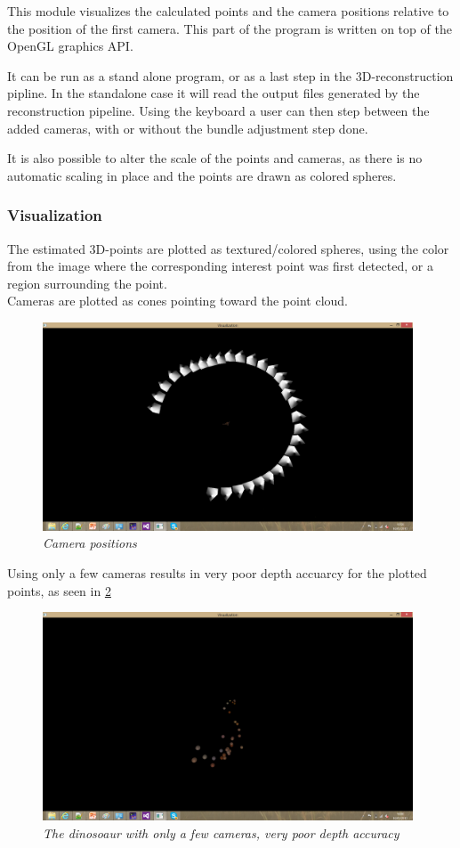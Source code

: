 This module visualizes the calculated points and the camera positions relative to the position of the first camera. This part of the program is written on top of the OpenGL graphics API.

It can be run as a stand alone program, or as a last step in the 3D-reconstruction pipline. In the standalone case it will read the output files generated by the reconstruction pipeline. Using the keyboard a user can then step between the added cameras, with or without the bundle adjustment step done.

It is also possible to alter the scale of the points and cameras, as there is no automatic scaling in place and the points are drawn as colored spheres.

\subsubsection{Visualization}
The estimated 3D-points are plotted as textured/colored spheres, using the color from the image where the corresponding interest point was first detected, or a region surrounding the point. \\
Cameras are plotted as cones pointing toward the point cloud.

\begin{figure}[htb]
	\centering
	\includegraphics[width=110mm]{images/camRingLots.png}
	\caption{\textit{Camera positions}}
	\label{fig:camRingLots}  %
\end{figure}

Using only a few cameras results in very poor depth accuarcy for the plotted points, as seen in 
\ref{fig:camRingFew}

\begin{figure}[htb]
	\centering
	\includegraphics[width=110mm]{images/pointCloudFewCam.png}
	\caption{\textit{The dinosoaur with only a few cameras, very poor depth accuracy}}
	\label{fig:camRingFew}  %
\end{figure}

